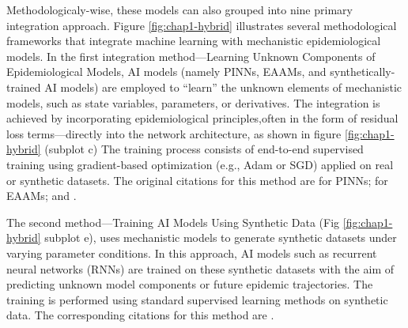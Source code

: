 Methodologicaly-wise, these models can also grouped into nine primary integration approach. Figure \ref{fig:chap1-hybrid} illustrates several methodological frameworks that integrate machine learning with mechanistic epidemiological models.  In the first integration method—Learning Unknown Components of Epidemiological Models, AI models (namely PINNs, EAAMs, and synthetically-trained AI models) are employed to “learn” the unknown elements of mechanistic models, such as state variables, parameters, or derivatives. The integration is achieved by incorporating epidemiological principles,often in the form of residual loss terms—directly into the network architecture, as shown in figure \ref{fig:chap1-hybrid} (subplot c) The training process consists of end-to-end supervised training using gradient-based optimization (e.g., Adam or SGD) applied on real or synthetic datasets. The original citations for this method are \cite{kharazmi_identifiability_2021, barmparis_physicsinformed_2022, de_rosa_modelling_2023, torku_seinn_2023,berkhahn_physics-informed_2022, rodriguez_einns_2023, shaier_data-driven_2022, bertaglia_asymptotic-preserving_2022, malinzi_determining_2022} for PINNs; \cite{liu_rolling_2023, otadi_universal_2017, liu_epidemiology-aware_2023, amini_mepognn_2023, sun_2022, gao_stan_2021, zheng_spatial-temporal_2021, ma_enhancing_2022, wang_causalgnn_2022, nguyen_becaked_2022, nguyen_becaked_2022-1} for EAAMs; and \cite{wang_tdefsi_2020, zhan_optimizing_2021, wang_deep_2021, bogacsovics_replacing_2021, wang_predicting_2022, murphy_deep_2021, zhang_understanding_2021, quilodran-casas_digital_2022, silva_data_2022}.

The second method—Training AI Models Using Synthetic Data (Fig \ref{fig:chap1-hybrid} subplot e), uses mechanistic models to generate synthetic datasets under varying parameter conditions. In this approach, AI models such as recurrent neural networks (RNNs) are trained on these synthetic datasets with the aim of predicting unknown model components or future epidemic trajectories. The training is performed using standard supervised learning methods on synthetic data. The corresponding citations for this method are \cite{petrica_inverse_2023,liu_prediction_2023,rahnsch_network-based_2024,kumar_epidemic_2023,ji_climate-dependent_2023,vega_simlr_2022,chen_covid-19_2023,alsmadi_susceptible_2023,qiu_prediction_2022,mu_modelling_2023,wang_machine_2021,wu_computer_2022,yao_assessment_2022,zhang_prediction_2021,wyss_modeling_2023,gadewadikar_methodology_2024,zisad_integrated_2021,merkelbach_hybridml_2022,munoz_hybrid_2022,castillo_ossa_hybrid_2021,jiang_countrywide_2021,yasami_application_2022,liao_sirvd-dl_2021,zheng_predicting_2020,watson_pandemic_2021,liu_nesting_2023,wang_policy_2022,wang_hypothesis-free_2022,deng_dynamics_2020,kim_determination_2021,gupta_deep-siqrv_2023,bousquet_deep_2022,feng_data_2022,ding_biology-informed_2023,khan_attention_2022,kumaresan_analysis_2022,long_identification_2021} .

